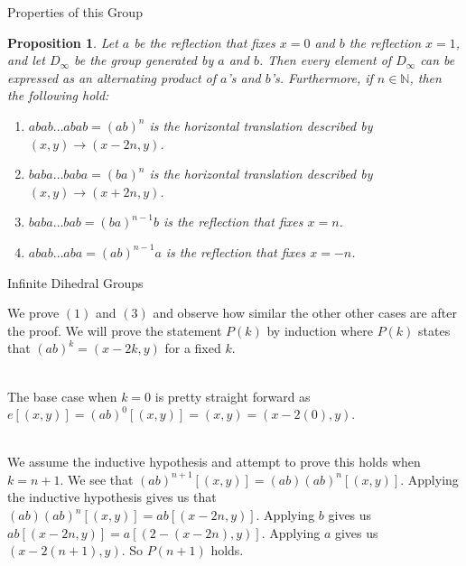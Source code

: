 \documentclass[usenames,dvipsnames]{beamer}
\newtheorem{proposition}{Proposition}
\begin{document}
\begin{frame}{Properties of this Group}

\begin{proposition}

Let $a$ be the reflection that fixes $x=0$ and $b$ the reflection $x=1$, and let $D_\infty$ be the group
generated by $a$ and $b$. Then every element of $D_\infty$ can be expressed as an alternating product of
$a$'s and $b$'s. Furthermore, if $n\in \mathbb{N}$, then the following hold:

\begin{enumerate}
  \item $abab\ldots abab=(ab)^{n}$ is the horizontal translation described by $(x,y)\rightarrow (x-2n,y)$.
  \item $baba\ldots baba=(ba)^{n}$ is the horizontal translation described by $(x,y)\rightarrow (x+2n,y)$.
  \item $baba\ldots bab=(ba)^{n-1}b$ is the reflection that fixes $x=n$.
  \item $abab\ldots aba=(ab)^{n-1}a$ is the reflection that fixes $x=-n$.
\end{enumerate}

\end{proposition}

\end{frame}

\begin{frame}{Infinite Dihedral Groups}

We prove $(1)$ and $(3)$ and observe how similar the other other cases are after the proof. We will prove
the statement $P(k)$ by induction where $P(k)$ states that $(ab)^{k}=(x-2k,y)$ for a fixed $k$. \\~\\

\pause

The base case when $k=0$ is pretty straight forward as $e[(x,y)]=(ab)^{0}[(x,y)]=(x,y)=(x-2(0),y)$. \\~\\

\pause

We assume the inductive hypothesis and attempt to prove this holds when $k=n+1$. We see that
$(ab)^{n+1}[(x,y)]=(ab)(ab)^{n}[(x,y)]$. Applying the inductive hypothesis gives us that
$(ab)(ab)^{n}[(x,y)]=ab[(x-2n,y)]$. Applying $b$ gives us $ab[(x-2n,y)]=a[(2-(x-2n),y)]$. Applying $a$
gives us $(x-2(n+1),y)$. So $P(n+1)$ holds.

\end{frame}
\end{document}
